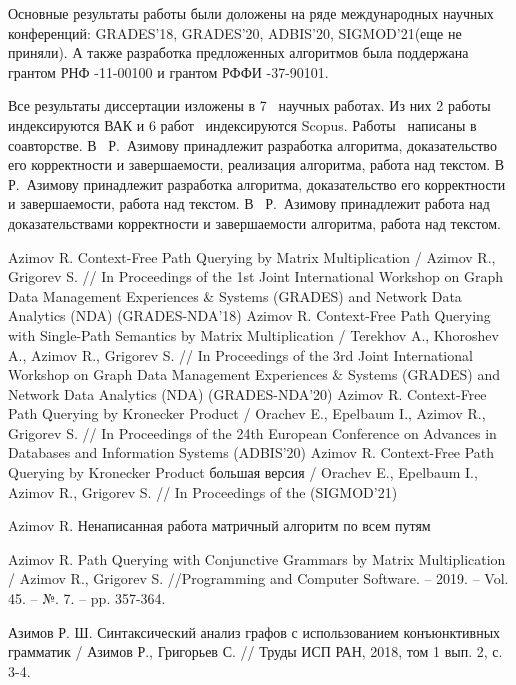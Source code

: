 Основные результаты работы были доложены на ряде международных научных конференций: GRADES'18, GRADES'20, ADBIS’20, SIGMOD'21(еще не приняли). А также разработка предложенных алгоритмов была поддержана грантом РНФ -11-00100 и грантом РФФИ -37-90101.


{\publications} Все результаты диссертации изложены в 7~\cite{1,2,3,4,5,6,7} научных работах. Из них 2 работы~\cite{6,7} индексируются ВАК и 6 работ~\cite{1,2,3,4,5,6} индексируются Scopus. Работы~\cite{1,2,3,4,6,7} написаны в соавторстве. В~\cite{1,6,7} Р.~Азимову принадлежит разработка алгоритма, доказательство его корректности и завершаемости, реализация алгоритма, работа над текстом. В~\cite{2} Р.~Азимову принадлежит разработка алгоритма, доказательство его корректности и завершаемости, работа над текстом. В~\cite{3,4} Р.~Азимову принадлежит работа над доказательствами корректности и завершаемости алгоритма, работа над текстом.


\begin{thebibliography}{99}
	 Azimov R. Context-Free Path Querying by
	Matrix Multiplication / Azimov R., Grigorev S. // In Proceedings of the
	1st Joint International Workshop on Graph Data Management Experiences \&
	Systems (GRADES) and Network Data Analytics (NDA) (GRADES-NDA’18)
	 Azimov R. Context-Free Path Querying with Single-Path Semantics by
	Matrix Multiplication / Terekhov A., Khoroshev A., Azimov R., Grigorev S. // In Proceedings of the
	3rd Joint International Workshop on Graph Data Management Experiences \&
	Systems (GRADES) and Network Data Analytics (NDA) (GRADES-NDA’20)
	 Azimov R. Context-Free Path Querying by Kronecker
	Product / Orachev E., Epelbaum I., Azimov R., Grigorev S. // In Proceedings of the
	24th European Conference on Advances in Databases and Information Systems (ADBIS’20)
	 Azimov R. Context-Free Path Querying by Kronecker
	Product большая версия / Orachev E., Epelbaum I., Azimov R., Grigorev S. // In Proceedings of the (SIGMOD’21)
	
	 Azimov R. Ненаписанная работа матричный алгоритм по всем путям
	
	 Azimov R. Path Querying with Conjunctive Grammars by Matrix Multiplication / Azimov R., Grigorev S. //Programming and Computer Software. – 2019. – Vol. 45. – №. 7. – pp. 357-364.
	\setcounter{firstbib}{\value{enumiv}}
	
	 Азимов Р. Ш. Синтаксический анализ графов с использованием конъюнктивных грамматик / Азимов Р., Григорьев С. // Труды ИСП РАН, 2018, том 1 вып. 2, с. 3-4.
	
\end{thebibliography}